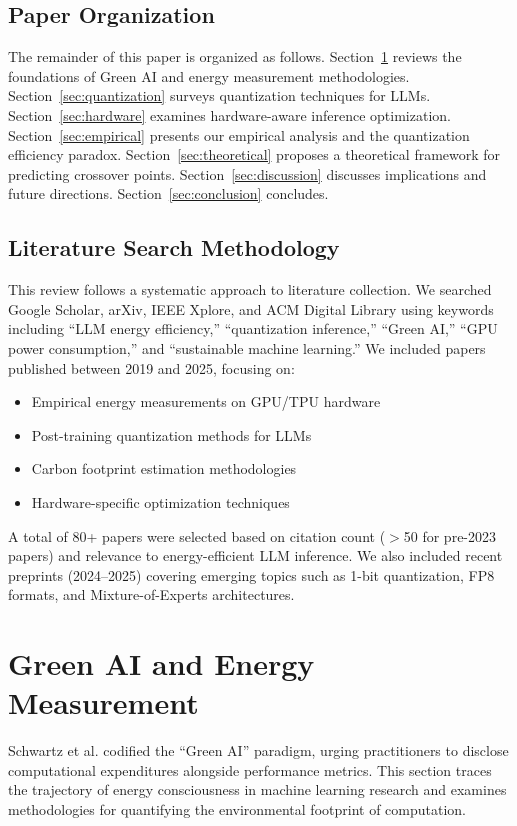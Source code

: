 \documentclass[11pt]{article}
\begin{document}
\subsection{Paper Organization}

The remainder of this paper is organized as follows. Section~\ref{sec:greenai} reviews the foundations of Green AI and energy measurement methodologies. Section~\ref{sec:quantization} surveys quantization techniques for LLMs. Section~\ref{sec:hardware} examines hardware-aware inference optimization. Section~\ref{sec:empirical} presents our empirical analysis and the quantization efficiency paradox. Section~\ref{sec:theoretical} proposes a theoretical framework for predicting crossover points. Section~\ref{sec:discussion} discusses implications and future directions. Section~\ref{sec:conclusion} concludes.

\subsection{Literature Search Methodology}

This review follows a systematic approach to literature collection. We searched Google Scholar, arXiv, IEEE Xplore, and ACM Digital Library using keywords including ``LLM energy efficiency,'' ``quantization inference,'' ``Green AI,'' ``GPU power consumption,'' and ``sustainable machine learning.'' We included papers published between 2019 and 2025, focusing on:
\begin{itemize}
    \item Empirical energy measurements on GPU/TPU hardware
    \item Post-training quantization methods for LLMs
    \item Carbon footprint estimation methodologies
    \item Hardware-specific optimization techniques
\end{itemize}
A total of 80+ papers were selected based on citation count ($>$50 for pre-2023 papers) and relevance to energy-efficient LLM inference. We also included recent preprints (2024--2025) covering emerging topics such as 1-bit quantization, FP8 formats, and Mixture-of-Experts architectures.

\section{Green AI and Energy Measurement}
\label{sec:greenai}

Schwartz et al. \cite{schwartz2020green} codified the ``Green AI'' paradigm, urging practitioners to disclose computational expenditures alongside performance metrics. This section traces the trajectory of energy consciousness in machine learning research and examines methodologies for quantifying the environmental footprint of computation.
\end{document}
